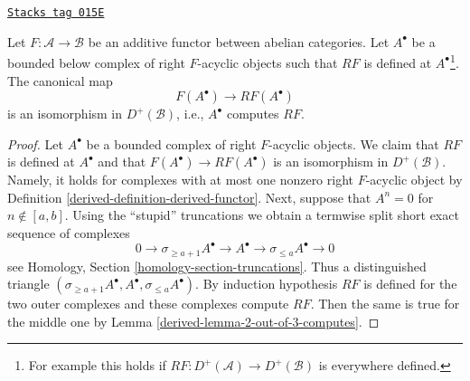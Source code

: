 \begin{lemma}

\label{derived-lemma-leray-acyclicity}
\href{https://stacks.math.columbia.edu/tag/015E}{\texttt{Stacks tag 015E}}

Let $F : \mathcal{A} \to \mathcal{B}$ be an additive functor
between abelian categories. Let $A^\bullet$ be a bounded below complex
of right $F$-acyclic objects such that $RF$ is defined at
$A^\bullet$\footnote{For example this holds if
$RF : D^{+}(\mathcal{A}) \to D^{+}(\mathcal{B})$ is everywhere defined.}.
The canonical map
$$
F(A^\bullet) \longrightarrow RF(A^\bullet)
$$
is an isomorphism in $D^{+}(\mathcal{B})$, i.e., $A^\bullet$ computes
$RF$.
\end{lemma}

\begin{proof}

Let $A^\bullet$ be a bounded complex of right $F$-acyclic objects.
We claim that $RF$ is defined at $A^\bullet$ and that
$F(A^\bullet) \to RF(A^\bullet)$ is an isomorphism in $D^+(\mathcal{B})$.
Namely, it holds for complexes with at most one nonzero right $F$-acyclic
object by Definition \ref{derived-definition-derived-functor}.
Next, suppose that
$A^n = 0$ for $n \not \in [a, b]$. Using the ``stupid'' truncations we obtain
a termwise split short exact sequence of complexes
$$
0 \to \sigma_{\geq a + 1} A^\bullet \to A^\bullet \to
\sigma_{\leq a} A^\bullet \to 0
$$
see
Homology, Section \ref{homology-section-truncations}.
Thus a distinguished triangle
$(\sigma_{\geq a + 1} A^\bullet, A^\bullet, \sigma_{\leq a} A^\bullet)$.
By induction hypothesis $RF$ is defined for the two outer complexes
and these complexes compute $RF$. Then the same is true for the middle one
by Lemma \ref{derived-lemma-2-out-of-3-computes}.


\end{proof}
